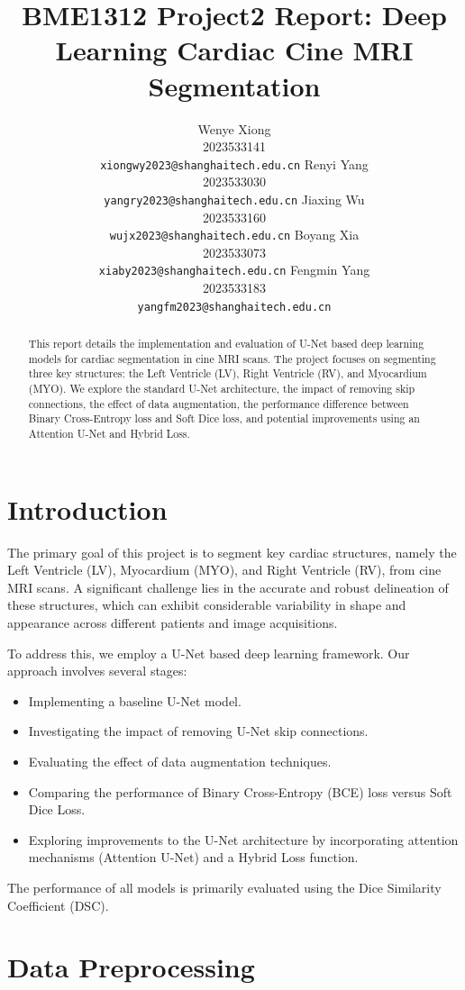 \documentclass{article}
\title{BME1312 Project2 Report: Deep Learning Cardiac Cine MRI Segmentation}
\author{%
  Wenye Xiong \\
  2023533141 \\
  \texttt{xiongwy2023@shanghaitech.edu.cn}
  \And
  Renyi Yang \\
  2023533030 \\
  \texttt{yangry2023@shanghaitech.edu.cn}
  \AND
  Jiaxing Wu \\
  2023533160 \\
  \texttt{wujx2023@shanghaitech.edu.cn}
  \And
  Boyang Xia \\
  2023533073 \\
  \texttt{xiaby2023@shanghaitech.edu.cn}
  \AND
  Fengmin Yang \\
  2023533183 \\
  \texttt{yangfm2023@shanghaitech.edu.cn}
}
\begin{document}
\maketitle


\begin{abstract}
  This report details the implementation and evaluation of U-Net based deep learning models for cardiac segmentation
  in cine MRI scans. The project focuses on segmenting three key structures: the Left Ventricle (LV), Right Ventricle (RV),
  and Myocardium (MYO). We explore the standard U-Net architecture, the impact of removing skip connections, the effect of
  data augmentation, the performance difference between Binary Cross-Entropy loss and Soft Dice loss, and potential improvements using an Attention U-Net and Hybrid Loss.
\end{abstract}

\section{Introduction}
The primary goal of this project is to segment key cardiac structures, namely the Left Ventricle (LV), Myocardium (MYO), and Right Ventricle (RV), from cine MRI scans. A significant challenge lies in the accurate and robust delineation of these structures, which can exhibit considerable variability in shape and appearance across different patients and image acquisitions.

To address this, we employ a U-Net based deep learning framework. Our approach involves several stages:
\begin{itemize}
  \item Implementing a baseline U-Net model.
  \item Investigating the impact of removing U-Net skip connections.
  \item Evaluating the effect of data augmentation techniques.
  \item Comparing the performance of Binary Cross-Entropy (BCE) loss versus Soft Dice Loss.
  \item Exploring improvements to the U-Net architecture by incorporating attention mechanisms (Attention U-Net) and a Hybrid Loss function.
\end{itemize}
The performance of all models is primarily evaluated using the Dice Similarity Coefficient (DSC).

\section{Data Preprocessing}
\end{document}
